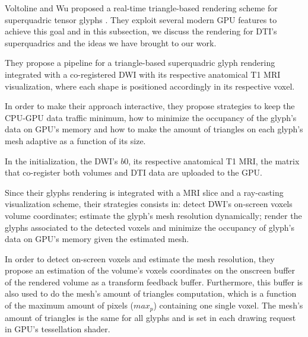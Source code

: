 \documentclass[twoside,twocolumn,10pt]{article}
\begin{document}
Voltoline and Wu \cite{voltoline2021} proposed a real-time triangle-based rendering scheme for superquadric tensor glyphs \cite{Kindlmann2004}. They exploit several modern GPU features to achieve this goal and in this subsection, we discuss the rendering for DTI's superquadrics and the ideas we have brought to our work.









They propose a pipeline for a triangle-based superquadric glyph rendering integrated with a co-registered DWI with its respective anatomical T1 MRI visualization, where each shape is positioned accordingly in its respective voxel.

In order to make their approach interactive, they propose strategies to keep the CPU-GPU data traffic minimum, how to minimize the occupancy of the glyph's data on GPU's memory and how to make the amount of triangles on each glyph's mesh adaptive as a function of its size.

In the initialization, the DWI's $b0$, its respective anatomical T1 MRI, the matrix that co-register both volumes and DTI data are uploaded to the GPU. 

Since their glyphs rendering is integrated with a MRI slice and a ray-casting visualization scheme, their strategies consists in: detect DWI's on-screen voxels volume coordinates; estimate the glyph's mesh resolution dynamically; render the glyphs associated to the detected voxels and minimize the occupancy of glyph's data on GPU's memory given the estimated mesh.

In order to detect on-screen voxels and estimate the mesh resolution, they propose an estimation of the volume's voxels coordinates on the onscreen buffer of the rendered volume as a transform feedback buffer. Furthermore, this buffer is also used to do the mesh's amount of triangles computation, which is a function of the maximum amount of pixels ($max_p$) containing one single voxel. The mesh's amount of triangles is the same for all glyphs and is set in each drawing request in GPU's tessellation shader.
\end{document}
